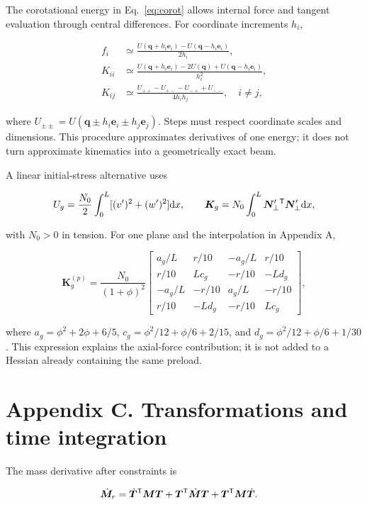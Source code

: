 The corotational energy in Eq.~\eqref{eq:corot} allows internal force and tangent evaluation through central differences. For coordinate increments $h_i$,

\begin{align}
f_i&\simeq\frac{U(\bm q+h_i\bm e_i)-U(\bm q-h_i\bm e_i)}{2h_i},\nonumber\\
K_{ii}&\simeq\frac{U(\bm q+h_i\bm e_i)-2U(\bm q)+U(\bm q-h_i\bm e_i)}{h_i^2},\nonumber\\
K_{ij}&\simeq\frac{U_{++}-U_{+-}-U_{-+}+U_{--}}{4h_ih_j},\quad i\ne j,
\end{align}

where $U_{\pm\pm}=U(\bm q\pm h_i\bm e_i\pm h_j\bm e_j)$. Steps must respect coordinate scales and dimensions. This procedure approximates derivatives of one energy; it does not turn approximate kinematics into a geometrically exact beam.

A linear initial-stress alternative uses

\begin{equation}
U_g=\frac{N_0}2\int_0^L[(v')^2+(w')^2]\mathrm d x,
\qquad \bm K_g=N_0\int_0^L\bm N_\perp'{}^\mathsf T\bm N_\perp'\mathrm d x,
\end{equation}

with $N_0>0$ in tension. For one plane and the interpolation in Appendix A,

\begin{equation}
\bm K_g^{(p)}=\frac{N_0}{(1+\phi)^2}\begin{bmatrix}
a_g/L&r/10&-a_g/L&r/10\\
r/10&Lc_g&-r/10&-Ld_g\\
-a_g/L&-r/10&a_g/L&-r/10\\
r/10&-Ld_g&-r/10&Lc_g
\end{bmatrix},
\end{equation}

where $a_g=\phi^2+2\phi+6/5$, $c_g=\phi^2/12+\phi/6+2/15$, and $d_g=\phi^2/12+\phi/6+1/30$. This expression explains the axial-force contribution; it is not added to a Hessian already containing the same preload.

\section{Appendix C. Transformations and time integration}
The mass derivative after constraints is

\begin{align}
\dot{\bm M}_r={}&\dot{\bm T}^\mathsf T\bm M\bm T+\bm T^\mathsf T\dot{\bm M}\bm T
+\bm T^\mathsf T\bm M\dot{\bm T}.
\end{align}

